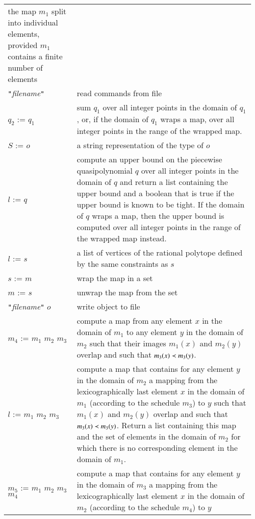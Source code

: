 \begin{supertabular}{p{0.35\textwidth}p{0.6\textwidth}}
the map $m_1$ split into individual elements,
provided $m_1$ contains a finite number of elements
\\
 {\tt "}{\it filename}{\tt"} &
read commands from file
\\
$q_2$ :=  $q_1$ &
sum $q_1$ over all integer points in the domain of $q_1$,
or, if the domain of $q_1$ wraps a map, over all integer
points in the range of the wrapped map.
\\
$S$ :=  $o$ &
a string representation of the type of $o$
\\
$l$ :=  $q$ &
compute an
upper bound on the piecewise quasipolynomial $q$ over
all integer points in the domain of $q$
and return a list containing the upper bound
and a boolean that is true if the upper bound
is known to be tight.
If the domain of $q$ wraps a map, then the upper
bound is computed over all integer points in
the range of the wrapped map instead.
\\
$l$ :=  $s$ &
a list of vertices of the rational polytope defined by the same constraints
as $s$
\\
$s$ :=  $m$ &
wrap the map in a set
\\
$m$ :=  $s$ &
unwrap the map from the set
\\
 {\tt "}{\it filename}{\tt"} $o$ &
write object to file
\\
$m_4$ :=  $m_1$  $m_2$  $m_3$ &
compute a map from any element $x$ in the domain of $m_1$
to any element $y$ in the domain of $m_2$
such that their images $m_1(x)$ and $m_2(y)$ overlap
and such that $m_3(x) \prec m_3(y)$.
\\
$l$ :=  $m_1$  $m_2$  $m_3$ &
compute a map that contains for any element $y$ in the domain of $m_2$
a mapping from the lexicographically last element $x$ in the domain of $m_1$
(according to the schedule $m_3$) to $y$
such that $m_1(x)$ and $m_2(y)$ overlap and such that $m_3(x) \prec m_3(y)$.
Return a list containing this map and the set of elements in the domain of
$m_2$ for which there is no corresponding element in the domain of $m_1$.
\\
$m_5$ :=  $m_1$  $m_2$  $m_3$
 $m_4$ &
compute a map that contains for any element $y$ in the domain of $m_3$
a mapping from the lexicographically last element $x$ in the domain of $m_2$
(according to the schedule $m_4$) to $y$

\end{supertabular}
